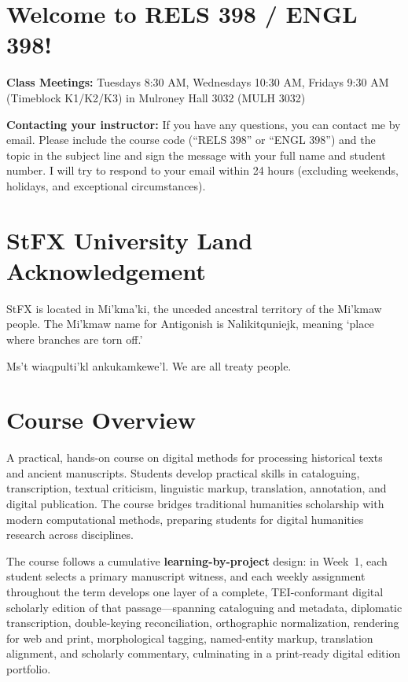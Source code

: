 \documentclass[12pt,oncampus]{article}
\begin{document}

\section*{Welcome to RELS 398 / ENGL 398!}


\textbf{Class Meetings:} Tuesdays 8:30 AM, Wednesdays 10:30 AM, Fridays 9:30 AM (Timeblock K1/K2/K3) in Mulroney Hall 3032 (MULH 3032)

\textbf{Contacting your instructor:} If you have any questions, you can contact me by email. Please include the course code (``RELS 398'' or ``ENGL 398'') and the topic in the subject line and sign the message with your full name and student number. I will try to respond to your email within 24 hours (excluding weekends, holidays, and exceptional circumstances).

\section*{StFX University Land Acknowledgement}

StFX is located in Mi’kma’ki, the unceded ancestral territory of the Mi'kmaw people. The Mi'kmaw name for Antigonish is Nalikitquniejk, meaning ‘place where branches are torn off.’

Ms't wiaqpulti'kl ankukamkewe'l. We are all treaty people.

\section*{Course Overview}

A practical, hands-on course on digital methods for processing historical texts and ancient manuscripts. Students develop practical skills in cataloguing, transcription, textual criticism, linguistic markup, translation, annotation, and digital publication. The course bridges traditional humanities scholarship with modern computational methods, preparing students for digital humanities research across disciplines.

The course follows a cumulative \textbf{learning-by-project} design: in Week~1, each student selects a primary manuscript witness, and each weekly assignment throughout the term develops one layer of a complete, TEI-conformant digital scholarly edition of that passage---spanning cataloguing and metadata, diplomatic transcription, double-keying reconciliation, orthographic normalization, rendering for web and print, morphological tagging, named-entity markup, translation alignment, and scholarly commentary, culminating in a print-ready digital edition portfolio.
\end{document}
